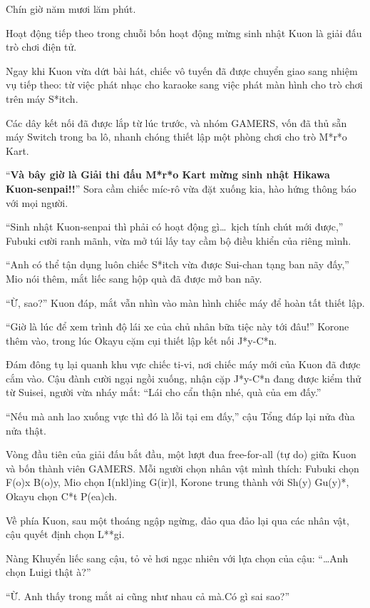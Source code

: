 \documentclass[../main.tex]{subfiles}
\begin{document}
\ct

Chín giờ năm mươi lăm phút.

Hoạt động tiếp theo trong chuỗi bốn hoạt động mừng sinh nhật Kuon là giải đấu trò chơi điện tử.

Ngay khi Kuon vừa dứt bài hát, chiếc vô tuyến đã được chuyển giao sang nhiệm vụ tiếp theo: từ việc phát nhạc cho karaoke sang việc phát màn hình cho trò chơi trên máy S*itch.

Các dây kết nối đã được lắp từ lúc trước, và nhóm GAMERS, vốn đã thủ sẵn máy Switch trong ba lô, nhanh chóng thiết lập một phòng chơi cho trò M*r*o Kart.

``\textbf{Và bây giờ là Giải thi đấu M*r*o Kart mừng sinh nhật Hikawa Kuon-senpai!!}'' Sora cầm chiếc míc-rô vừa đặt xuống kia, hào hứng thông báo với mọi người.

``Sinh nhật Kuon-senpai thì phải có hoạt động gì\dots\ kịch tính chút mới được,'' Fubuki cười ranh mãnh, vừa mở túi lấy tay cầm bộ điều khiển của riêng mình.

``Anh có thể tận dụng luôn chiếc S*itch vừa được Sui-chan tạng ban nãy đấy,'' Mio nói thêm, mắt liếc sang hộp quà đã được mở ban nãy.

``Ừ, sao?'' Kuon đáp, mắt vẫn nhìn vào màn hình chiếc máy để hoàn tất thiết lập.

``Giờ là lúc để xem trình độ lái xe của chủ nhân bữa tiệc này tới đâu!''  Korone thêm vào, trong lúc Okayu cặm cụi thiết lập kết nối J*y-C*n.

Đám đông tụ lại quanh khu vực chiếc ti-vi, nơi chiếc máy mới của Kuon đã được cắm vào. Cậu đành cười ngại ngồi xuống, nhận cặp J*y-C*n đang được kiểm thử từ Suisei, người vừa nháy mắt: ``Lái cho cẩn thận nhé, quà của em đấy.''

``Nếu mà anh lao xuống vực thì đó là lỗi tại em đấy,'' cậu Tổng đáp lại nửa đùa nửa thật.

Vòng đầu tiên của giải đấu bắt đầu, một lượt đua free-for-all (tự do) giữa Kuon và bốn thành viên GAMERS. Mỗi người chọn nhân vật mình thích: Fubuki chọn F(o)x B(o)y, Mio chọn I(nkl)ing G(ir)l, Korone trung thành với Sh(y) Gu(y)*, Okayu chọn C*t P(ea)ch.

Về phía Kuon, sau một thoáng ngập ngừng, đảo qua đảo lại qua các nhân vật, cậu quyết định chọn L**gi.

Nàng Khuyển liếc sang cậu, tỏ vẻ hơi ngạc nhiên với lựa chọn của cậu: ``\dots Anh chọn Luigi thật à?''

``Ừ. Anh thấy trong mắt ai cũng như nhau cả mà.Có gì sai sao?''
\end{document}
